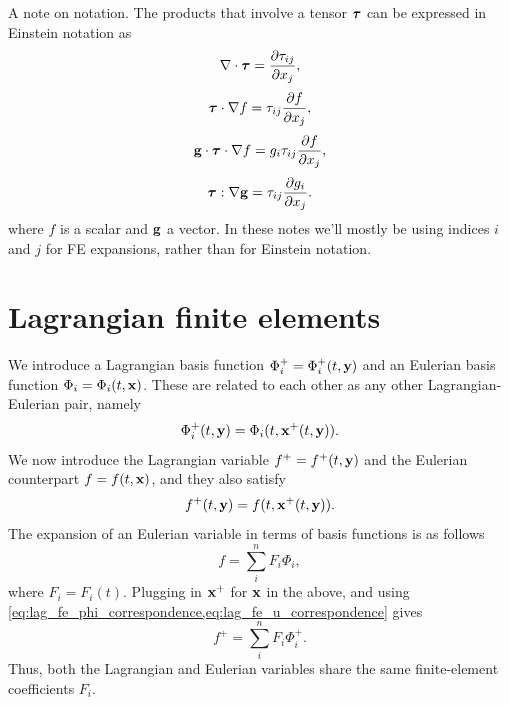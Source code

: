 \documentclass[11pt]{report}
\begin{document}
A note on notation. The products that involve a tensor $\bm \tau$ can be expressed in Einstein notation as
\begin{equation}
    \nabla \cdot \bm \tau = \frac{\partial \tau_{ij}}{\partial x_j},
\end{equation}
\begin{equation}
    \bm \tau \cdot \nabla f = \tau_{ij} \frac{\partial f}{\partial x_j},
\end{equation}
\begin{equation}
    \mathbf{g} \cdot \bm \tau \cdot \nabla f = g_i \tau_{ij} \frac{\partial f}{\partial x_j},
\end{equation}
\begin{equation}
    \bm \tau : \nabla \mathbf{g} = \tau_{ij} \frac{\partial g_i}{\partial x_j}.
\end{equation}
where $f$ is a scalar and $\mathbf{g}$ a vector. In these notes we'll mostly be using indices $i$ and $j$ for FE expansions, rather than for Einstein notation.

\section{Lagrangian finite elements}
\label{sec:lag_fin_elem}
We introduce a Lagrangian basis function $\Phi_i^+ = \Phi_i^+(t,\mathbf{y})$ and an Eulerian basis function $\Phi_i = \Phi_i(t,\mathbf{x})$. These are related to each other as any other Lagrangian-Eulerian pair, namely 
\begin{equation}
    \label{eq:lag_fe_phi_correspondence}
    \Phi_i^+(t,\mathbf{y}) = \Phi_i(t,\mathbf{x}^+(t,\mathbf{y})).
\end{equation}
We now introduce the Lagrangian variable $f^+ = f^+(t,\mathbf{y})$ and the Eulerian counterpart $f = f(t,\mathbf{x})$, and they also satisfy
\begin{equation}
    \label{eq:lag_fe_u_correspondence}
    f^+(t,\mathbf{y}) = f(t,\mathbf{x}^+(t,\mathbf{y})).
\end{equation}
The expansion of an Eulerian variable in terms of basis functions is as follows
\begin{equation}
    \label{eq:lag_fe_expansion_eul}
    f = \sum_i^n F_i \Phi_i,
\end{equation}
where $F_i = F_i(t)$. Plugging in $\mathbf{x}^+$ for $\mathbf{x}$ in the above, and using \cref{eq:lag_fe_phi_correspondence,eq:lag_fe_u_correspondence} gives
\begin{equation}
    \label{eq:fe_lag_expansion_lag}
    f^+ = \sum_i^n F_i \Phi_i^+.
\end{equation}
Thus, both the Lagrangian and Eulerian variables share the same finite-element coefficients $F_i$. 
\end{document}
